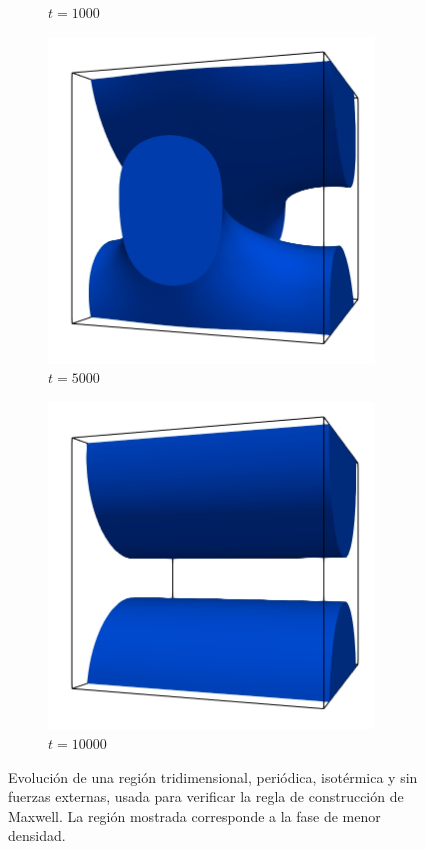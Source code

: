 \begin{figure}[htb]
\begin{subfigure}[t]{0.45\textwidth}
        \caption{$t = 1000$}
    \end{subfigure}    
    \begin{subfigure}[t]{0.45\textwidth}
        \centering
        \includegraphics[width=0.95\textwidth]{Imagenes/Maxwell3D/Maxwell3D_sim/Imagenes/t_5000}
        \caption{$t = 5000$}
    \end{subfigure}
    \begin{subfigure}[t]{0.45\textwidth}
        \centering
        \includegraphics[width=0.95\textwidth]{Imagenes/Maxwell3D/Maxwell3D_sim/Imagenes/t_10000}
        \caption{$t = 10000$}
    \end{subfigure}        
    \caption{Evoluci\'on de una regi\'on tridimensional, peri\'odica, isot\'ermica y sin fuerzas externas, usada para verificar la regla de construcci\'on de Maxwell. La regi\'on mostrada corresponde a la fase de menor densidad.}
    \label{fig:maxwell_3d}
\end{figure}
